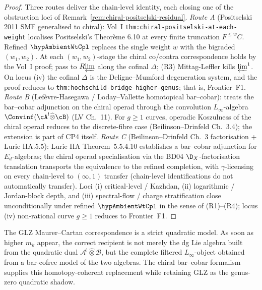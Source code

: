 \begin{proof}
Three routes deliver the chain-level identity, each closing one of
the obstruction loci of
Remark~\ref{rem:chiral-positselski-residual}.
\emph{Route A} (Positselski 2011 SMF generalised to chiral): Vol~I
\texttt{thm:chiral-positselski-at-each-weight} localises Positselski's
Theor\`eme 6.10 at every finite truncation $F^{\le w} C$. Refined
$\hypAmbientWtCpl$ replaces the single weight $w$ with the bigraded
$(w_1, w_2)$. At each $(w_1, w_2)$-stage the chiral co/contra
correspondence holds by the Vol~I proof; pass to $R\!\varprojlim$
along the cofinal $\Delta$; (R3) Mittag-Leffler kills $\varprojlim^1$.
On locus (iv) the cofinal $\Delta$ is the Deligne--Mumford degeneration
system, and the proof reduces to
\texttt{thm:hochschild-bridge-higher-genus}; that is, Frontier~F1.
\emph{Route B} (Lefèvre-Hasegawa / Loday--Vallette homotopical
bar--cobar): treats the bar--cobar adjunction on the chiral operad
through the convolution $L_\infty$-algebra
$\Convinf(\cA^! \widehat\otimes \cB)$ \textup{(}LV Ch.~11\textup{)}.
For $g \ge 1$ curves, operadic Koszulness of the chiral operad reduces
to the discrete-fibre case (Beilinson--Drinfeld Ch.~3.4); the
extension is part of CP4 itself.
\emph{Route C} (Beilinson--Drinfeld Ch.~3 factorisation + Lurie
HA.5.5): Lurie HA Theorem~5.5.4.10 establishes a bar--cobar adjunction
for $E_d$-algebras; the chiral operad specialisation via the BD04
$\D_X$-factorisation translation transports the equivalence to the
refined completion, with $\gamma$-licensing on every chain-level to
$(\infty, 1)$ transfer (chain-level identifications do not
automatically transfer).
Loci (i) critical-level / Kazhdan, (ii) logarithmic / Jordan-block
depth, and (iii) spectral-flow / charge stratification close
unconditionally under refined $\hypAmbientWtCpl$ in the sense of (R1)--(R4);
locus (iv) non-rational curve $g \ge 1$ reduces to Frontier~F1.
\end{proof}

\begin{remark}
\label{rem:glz-homotopy-upgrade}
The GLZ Maurer--Cartan correspondence is a strict quadratic model. As
soon as higher $m_k$ appear, the correct recipient is not merely the
dg Lie algebra built from the quadratic dual
$\mathcal{A}^!\widehat\otimes \mathcal{B}$, but the complete filtered
$L_\infty$-object obtained from a bar-cofree model of the two
algebras. The chiral bar--cobar formalism supplies this
homotopy-coherent replacement while retaining GLZ as the genus-zero
quadratic shadow.
\end{remark}

